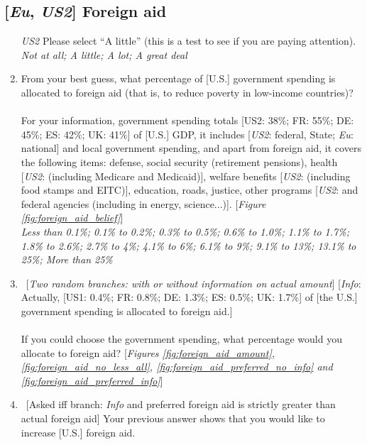 \subsection*{[\textit{Eu}, \textit{US2}] Foreign aid}
\begin{enumerate}[resume] 
    \item [\textit{US2}] Please select ``A little'' (this is a test to see if you are paying attention).
    \\ \textit{Not at all; A little; A lot; A great deal}
    \item \label{q:foreign_aid_belief} From your best guess, what percentage of [U.S.] government spending is allocated to foreign aid (that is, to reduce poverty in low-income countries)?\\
 \\
    For your information, government spending totals [US2: 38\%; FR: 55\%; DE: 45\%; ES: 42\%; UK: 41\%] of [U.S.] GDP, it includes [\textit{US2}: federal, State; \textit{Eu}: national] and local government spending, and apart from foreign aid, it covers the following items: defense, social security (retirement pensions), health [\textit{US2}: (including Medicare and Medicaid)], welfare benefits [\textit{US2}: (including food stamps and EITC)], education, roads, justice, other programs [\textit{US2}: and federal agencies (including in energy, science...)]. [\textit{Figure \ref{fig:foreign_aid_belief}}]
   \\ \textit{Less than 0.1\%; 0.1\% to 0.2\%; 0.3\% to 0.5\%; 0.6\% to 1.0\%; 1.1\% to 1.7\%; 1.8\% to 2.6\%; 2.7\% to 4\%; 4.1\% to 6\%; 6.1\% to 9\%; 9.1\% to 13\%; 13.1\% to 25\%; More than 25\%}
   \item \label{q:foreign_aid_preferred} ~[\textit{Two random branches: with or without information on actual amount}] [\textit{Info}: Actually, [US1: 0.4\%; FR: 0.8\%; DE: 1.3\%; ES: 0.5\%; UK: 1.7\%] of [the U.S.] government spending is allocated to foreign aid.]\\
 \\
   If you could choose the government spending, what percentage would you allocate to foreign aid? [\textit{Figures \ref{fig:foreign_aid_amount}, \ref{fig:foreign_aid_no_less_all}, \ref{fig:foreign_aid_preferred_no_info} and \ref{fig:foreign_aid_preferred_info}}]
  \item \label{q:foreign_aid_raise_how} ~[Asked iff branch: \textit{Info} and preferred foreign aid is strictly greater than actual foreign aid]  Your previous answer shows that you would like to increase [U.S.] foreign aid.\\

\end{enumerate}

